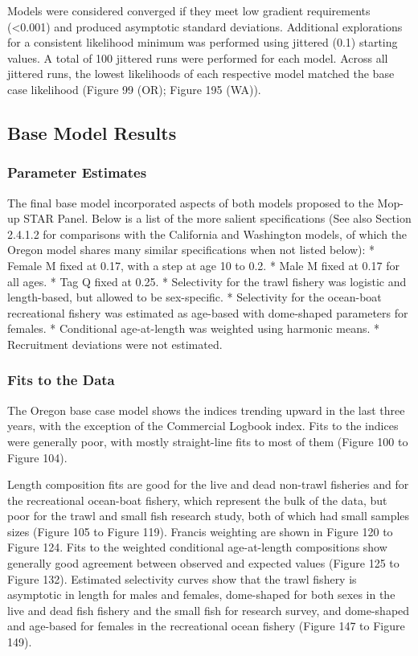 \documentclass[11pt,
  english,
  letterpaper,
]{article}
\begin{document}
Models were considered converged if they meet low gradient requirements (\textless0.001) and produced asymptotic standard deviations. Additional explorations for a consistent likelihood minimum was performed using jittered (0.1) starting values. A total of 100 jittered runs were performed for each model. Across all jittered runs, the lowest likelihoods of each respective model matched the base case likelihood (Figure 99 (OR); Figure 195 (WA)).

\hypertarget{base-model-results}{%
\subsection{Base Model Results}\label{base-model-results}}

\hypertarget{parameter-estimates}{%
\subsubsection{Parameter Estimates}\label{parameter-estimates}}

The final base model incorporated aspects of both models proposed to the Mop-up STAR Panel. Below is a list of the more salient specifications (See also Section 2.4.1.2 for comparisons with the California and Washington models, of which the Oregon model shares many similar specifications when not listed below): * Female M fixed at 0.17, with a step at age 10 to 0.2. * Male M fixed at 0.17 for all ages. * Tag Q fixed at 0.25. * Selectivity for the trawl fishery was logistic and length-based, but allowed to be sex-specific. * Selectivity for the ocean-boat recreational fishery was estimated as age-based with dome-shaped parameters for females. * Conditional age-at-length was weighted using harmonic means. * Recruitment deviations were not estimated.

\hypertarget{fits-to-the-data}{%
\subsubsection{Fits to the Data}\label{fits-to-the-data}}

The Oregon base case model shows the indices trending upward in the last three years, with the exception of the Commercial Logbook index. Fits to the indices were generally poor, with mostly straight-line fits to most of them (Figure 100 to Figure 104).

Length composition fits are good for the live and dead non-trawl fisheries and for the recreational ocean-boat fishery, which represent the bulk of the data, but poor for the trawl and small fish research study, both of which had small samples sizes (Figure 105 to Figure 119). Francis weighting are shown in Figure 120 to Figure 124. Fits to the weighted conditional age-at-length compositions show generally good agreement between observed and expected values (Figure 125 to Figure 132). Estimated selectivity curves show that the trawl fishery is asymptotic in length for males and females, dome-shaped for both sexes in the live and dead fish fishery and the small fish for research survey, and dome-shaped and age-based for females in the recreational ocean fishery (Figure 147 to Figure 149).
\end{document}
